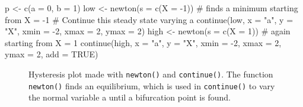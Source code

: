 \documentclass[
  a4paper,
  DIV=11,
  numbers=noendperiod,
  oneside]{scrreprt}
\newenvironment{Shaded}{}{}
\newcommand{\AttributeTok}[1]{\textcolor[rgb]{0.84,0.23,0.29}{#1}}
\newcommand{\CommentTok}[1]{\textcolor[rgb]{0.42,0.45,0.49}{#1}}
\newcommand{\ConstantTok}[1]{\textcolor[rgb]{0.00,0.36,0.77}{#1}}
\newcommand{\DecValTok}[1]{\textcolor[rgb]{0.00,0.36,0.77}{#1}}
\newcommand{\FunctionTok}[1]{\textcolor[rgb]{0.44,0.26,0.76}{#1}}
\newcommand{\NormalTok}[1]{\textcolor[rgb]{0.14,0.16,0.18}{#1}}
\newcommand{\OtherTok}[1]{\textcolor[rgb]{0.44,0.26,0.76}{#1}}
\newcommand{\SpecialCharTok}[1]{\textcolor[rgb]{0.00,0.36,0.77}{#1}}
\newcommand{\StringTok}[1]{\textcolor[rgb]{0.01,0.18,0.38}{#1}}
\begin{document}
\begin{Shaded}
\begin{Highlighting}[]
\NormalTok{p }\OtherTok{\textless{}{-}} \FunctionTok{c}\NormalTok{(}\AttributeTok{a =} \DecValTok{0}\NormalTok{, }\AttributeTok{b =} \DecValTok{1}\NormalTok{)}
\NormalTok{low }\OtherTok{\textless{}{-}} \FunctionTok{newton}\NormalTok{(}\AttributeTok{s =} \FunctionTok{c}\NormalTok{(}\AttributeTok{X =} \SpecialCharTok{{-}}\DecValTok{1}\NormalTok{)) }\CommentTok{\# finds a minimum starting from X = {-}1}
\CommentTok{\# Continue this steady state varying a}
\FunctionTok{continue}\NormalTok{(low, }\AttributeTok{x =} \StringTok{"a"}\NormalTok{, }\AttributeTok{y =} \StringTok{"X"}\NormalTok{, }\AttributeTok{xmin =} \SpecialCharTok{{-}}\DecValTok{2}\NormalTok{, }\AttributeTok{xmax =} \DecValTok{2}\NormalTok{, }\AttributeTok{ymax =} \DecValTok{2}\NormalTok{) }
\NormalTok{high }\OtherTok{\textless{}{-}} \FunctionTok{newton}\NormalTok{(}\AttributeTok{s =} \FunctionTok{c}\NormalTok{(}\AttributeTok{X =} \DecValTok{1}\NormalTok{)) }\CommentTok{\# again starting from X = 1}
\FunctionTok{continue}\NormalTok{(high, }\AttributeTok{x =} \StringTok{"a"}\NormalTok{, }\AttributeTok{y =} \StringTok{"X"}\NormalTok{, }\AttributeTok{xmin =} \SpecialCharTok{{-}}\DecValTok{2}\NormalTok{, }\AttributeTok{xmax =} \DecValTok{2}\NormalTok{, }\AttributeTok{ymax =} \DecValTok{2}\NormalTok{, }\AttributeTok{add =} \ConstantTok{TRUE}\NormalTok{)}
\end{Highlighting}
\end{Shaded}

\begin{figure}


\caption{\label{fig-ch4n-img3-old-51}Hysteresis plot made with
\texttt{newton()} and \texttt{continue()}. The function
\texttt{newton()} finds an equilibrium, which is used in
\texttt{continue()} to vary the normal variable a until a bifurcation
point is found.}

\end{figure}%
\end{document}

